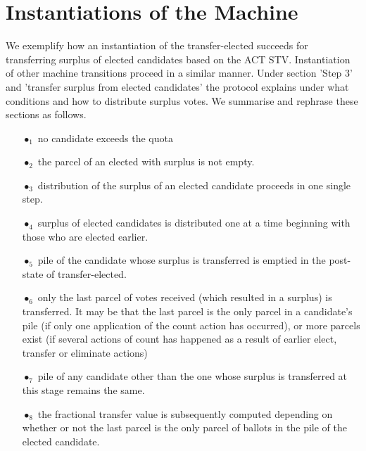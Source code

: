 \documentclass[10pt,conference]{IEEEtran}
\begin{document}
\section{Instantiations of the Machine}\label{sec:InstMachine}
We exemplify how an instantiation of the transfer-elected succeeds for transferring surplus of elected candidates based on the ACT STV.
 Instantiation of other machine transitions proceed in a  similar manner. Under section 'Step 3' and 'transfer surplus from elected candidates' the protocol explains under what conditions and how to distribute surplus votes. We summarise and rephrase these sections as follows. 
\begin{itemize}
\item[$\bullet_{1}$] no  candidate exceeds the quota
\item[$\bullet_{2}$] the  parcel of an elected with surplus is not empty.
\item[$\bullet_{3}$] distribution of the surplus of an elected candidate proceeds in one single step.
\item[$\bullet_{4}$] surplus of elected candidates is distributed one at a time beginning with those who are elected earlier. 
\item[$\bullet_{5}$] pile of the candidate whose surplus is transferred is emptied in the post-state of transfer-elected.
\item[$\bullet_{6}$] only the last parcel of votes  received (which resulted in a surplus) is transferred. It may be that the last parcel is the only parcel in a candidate's pile (if only one application of the count action has occurred), or more parcels exist (if several actions of count has happened as a result of earlier  elect, transfer or eliminate actions)
\item[$\bullet_{7}$] pile of any candidate other than the one whose surplus is transferred at this stage remains the same.
\item[$\bullet_{8}$] the fractional transfer value is subsequently computed depending on whether or not the last parcel is the only parcel of ballots in the pile of the elected candidate. 
\end{itemize}
\end{document}
